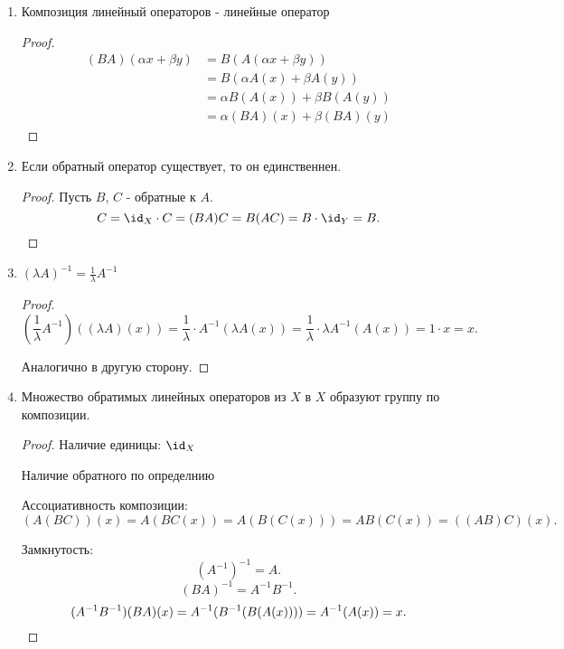 \begin{properties} \thmslashn

    \begin{enumerate}
        \item Композиция линейный операторов - линейные оператор
            \begin{proof} \thmslashn
            
                \begin{equation*}
                    \begin{split}
                        (BA)(\alpha x + \beta y) 
                        &= B(A(\alpha x + \beta y))\\
                        &= B(\alpha A(x) + \beta A(y))\\
                        &= \alpha B(A(x)) + \beta B(A(y))\\
                        &= \alpha (BA)(x) + \beta (BA)(y)
                    \end{split}
                \end{equation*}
            \end{proof}
        \item Если обратный оператор существует, то он единственнен.
            \begin{proof} \thmslashn
            
                Пусть $B$, $C$ - обратные к $A$.
                \[ C = \id_X \cdot C = (BA)C = B(AC) = B \cdot \id_{Y} = B .\qedhere\] 
            \end{proof}
        \item $(\lambda A)^{-1} = \frac{1}{\lambda} A^{-1}$ 
            \begin{proof} \thmslashn
            
                \[ (\frac{1}{\lambda} A^{-1})((\lambda A)(x)) = \frac{1}{\lambda} \cdot A^{-1}(\lambda A(x)) = \frac{1}{\lambda} \cdot \lambda A^{-1}(A(x)) = 1 \cdot x = x .\]

                Аналогично в другую сторону.
            \end{proof}
        \item Множество обратимых линейных операторов из $X$ в $X$ образуют группу по композиции.
            \begin{proof} \thmslashn
            
                Наличие единицы: $\id_{X}$

                Наличие обратного по определнию

                Ассоциативность композиции:
                \[ (A(BC))(x) = A(BC(x)) = A(B(C(x))) = AB(C(x)) = ((AB)C)(x) .\]

                Замкнутость:
                \[ (A^{-1})^{-1} = A .\]
                \[ (BA)^{-1} = A^{-1}B^{-1} .\]
                \[ (A^{-1}B^{-1})(BA)(x) = A^{-1}(B^{-1}(B(A(x)))) = A^{-1}(A(x)) = x .\qedhere\] 
            \end{proof}
    \end{enumerate}
\end{properties}
